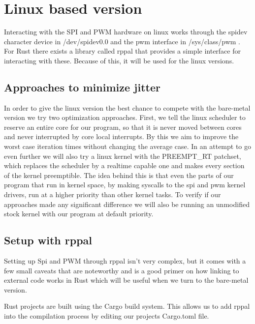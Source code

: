 \section{Linux based version}
\label{sec:concept_and_implementation:linux}

Interacting with the SPI and PWM hardware on linux works through the spidev character device in /dev/spidev0.0 and the pwm interface in /sys/class/pwm .
For Rust there exists a library called rppal that provides a simple interface for interacting with these.
Because of this, it will be used for the linux versions.

\subsection{Approaches to minimize jitter}
\label{sec:concept_and_implementation:linux:approaches}

In order to give the linux version the best chance to compete with the bare-metal version we try two optimization approaches.
First, we tell the linux scheduler to reserve an entire core for our program, so that it is never moved between cores and never interrupted by core local interrupts.
By this we aim to improve the worst case iteration times without changing the average case.
In an attempt to go even further we will also try a linux kernel with the PREEMPT\_RT patchset,
which replaces the scheduler by a realtime capable one and makes every section of the kernel preemptible.
The idea behind this is that even the parts of our program that run in kernel space,
by making syscalls to the spi and pwm kernel drivers, run at a higher priority than other kernel tasks.
To verify if our approaches made any significant difference we will also be running an unmodified stock kernel with our program at default priority.

\subsection{Setup with rppal}
\label{sec:concept_and_implementation:linux:rppal}

Setting up Spi and PWM through rppal isn't very complex,
but it comes with a few small caveats that are noteworthy
and is a good primer on how linking to external code works in Rust which will be useful when we turn to the bare-metal version.

Rust projects are built using the Cargo build system. This allows us to add rppal into the compilation process by editing our projects Cargo.toml file.

